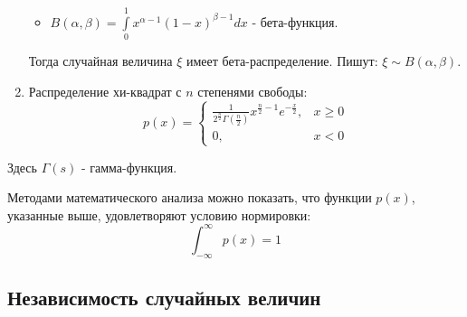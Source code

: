 \begin{enumerate}
\begin{itemize}
		\item $B(\alpha, \beta) = \int\limits_{0}^{1} x^{\alpha - 1} (1 - x)^{\beta - 1} dx$ - бета-функция.
	\end{itemize}
	Тогда случайная величина $\xi$ имеет бета-распределение. Пишут: $\xi \sim B(\alpha, \beta)$.
	\item Распределение хи-квадрат с $n$ степенями свободы:
	\[
	p(x) =
	\begin{cases}
		\frac{1}{2^{\frac{n}{2}} \Gamma \left(\frac{n}{2}\right)} x^{\frac{n}{2} - 1} e^{- \frac{x}{2}}, &x \ge 0 \\
		0, &x < 0
	\end{cases}
	\]
\end{enumerate}
Здесь $\Gamma(s)$ - гамма-функция.

Методами математического анализа можно показать, что функции $p(x)$, указанные выше, удовлетворяют условию
нормировки:
\[ \int_{-\infty}^{\infty} p(x) = 1 \]

\subsection{Независимость случайных величин}

